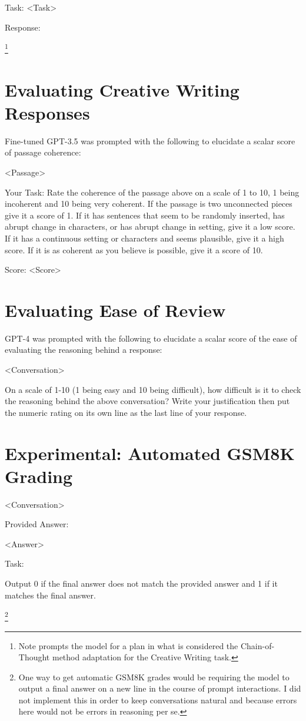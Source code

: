 \documentclass[11pt]{article}
\begin{document}
Task: <Task>

Response:

\footnote{Note \citealp{yao_tree_2023} prompts the model for a plan in what is considered the Chain-of-Thought method adaptation for the Creative Writing task.}

\section{Evaluating Creative Writing Responses}
\label{sec:evaluating_creative_writing}

Fine-tuned GPT-3.5 was prompted with the following to elucidate a scalar score of passage coherence:

<Passage>

Your Task: Rate the coherence of the passage above on a scale of 1 to 10, 1 being incoherent and 10 being very coherent. If the passage is two unconnected pieces give it a score of 1. If it has sentences that seem to be randomly inserted, has abrupt change in characters, or has abrupt change in setting, give it a low score. If it has a continuous setting or characters and seems plausible, give it a high score. If it is as coherent as you believe is possible, give it a score of 10.

Score: <Score>

\section{Evaluating Ease of Review}
\label{sec:evaluating_ease_of_review}

GPT-4 was prompted with the following to elucidate a scalar score of the ease of evaluating the reasoning behind a response:

<Conversation>

On a scale of 1-10 (1 being easy and 10 being difficult), how difficult is it to check the reasoning behind the above conversation? Write your justification then put the numeric rating on its own line as the last line of your response.

\section{Experimental: Automated GSM8K Grading}
\label{sec:automated_gsm8k_grading}

<Conversation>

Provided Answer:

<Answer>

Task:

Output 0 if the final answer does not match the provided answer and 1 if it matches the final answer.

\footnote{One way to get automatic GSM8K grades would be requiring the model to output a final answer on a new line in the course of prompt interactions. I did not implement this in order to keep conversations natural and because errors here would not be errors in reasoning per se.}
\end{document}

